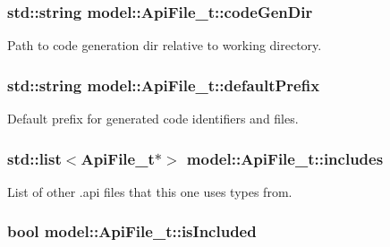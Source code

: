 \subsubsection[{\texorpdfstring{code\+Gen\+Dir}{codeGenDir}}]{\setlength{\rightskip}{0pt plus 5cm}std\+::string model\+::\+Api\+File\+\_\+t\+::code\+Gen\+Dir}\hypertarget{structmodel_1_1_api_file__t_a6bcef976a865a4a1e46edf43ab769afd}{}\label{structmodel_1_1_api_file__t_a6bcef976a865a4a1e46edf43ab769afd}


Path to code generation dir relative to working directory. 

\subsubsection[{\texorpdfstring{default\+Prefix}{defaultPrefix}}]{\setlength{\rightskip}{0pt plus 5cm}std\+::string model\+::\+Api\+File\+\_\+t\+::default\+Prefix}\hypertarget{structmodel_1_1_api_file__t_a51421c49c4e2ee0da6c6a13ef2aea4c5}{}\label{structmodel_1_1_api_file__t_a51421c49c4e2ee0da6c6a13ef2aea4c5}


Default prefix for generated code identifiers and files. 

\subsubsection[{\texorpdfstring{includes}{includes}}]{\setlength{\rightskip}{0pt plus 5cm}std\+::list$<${\bf Api\+File\+\_\+t}$\ast$$>$ model\+::\+Api\+File\+\_\+t\+::includes}\hypertarget{structmodel_1_1_api_file__t_a711ebebdd7b82d7ed8ca6874f9b1ff32}{}\label{structmodel_1_1_api_file__t_a711ebebdd7b82d7ed8ca6874f9b1ff32}


List of other .api files that this one uses types from. 

\subsubsection[{\texorpdfstring{is\+Included}{isIncluded}}]{\setlength{\rightskip}{0pt plus 5cm}bool model\+::\+Api\+File\+\_\+t\+::is\+Included}\hypertarget{structmodel_1_1_api_file__t_ab80e4d9268b8c5415ccf0cb708852488}{}\label{structmodel_1_1_api_file__t_ab80e4d9268b8c5415ccf0cb708852488}


